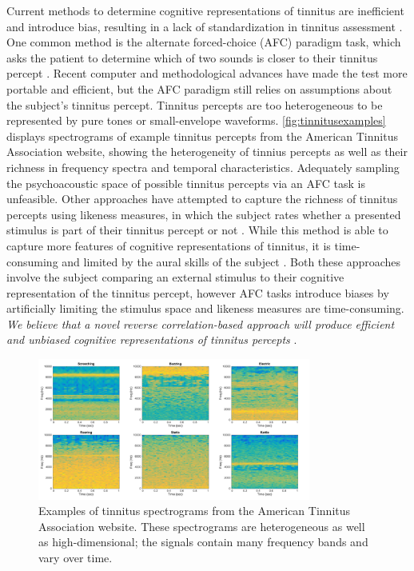 \documentclass[11pt, notitlepage]{article} %
\begin{document}
Current methods to determine cognitive representations of tinnitus
are inefficient and introduce bias, resulting in a lack of standardization in tinnitus assessment \cite{henryTinnitusEpidemiologicPerspective2020}.
One common method is the alternate forced-choice (AFC) paradigm task, which asks the patient to determine which of two sounds
is closer to their tinnitus percept
\cite{henryComparisonTwoComputerautomated2001,henryComputerautomatedTinnitusAssessment2004,henryComputerautomatedTinnitusAssessment2013,korthOneStepCloser2020}.
Recent computer and methodological advances have made the test more portable and efficient,
but the AFC paradigm still relies on assumptions about the subject's tinnitus percept.
Tinnitus percepts are too heterogeneous to be represented by pure tones or small-envelope waveforms.
\autoref{fig:tinnitusexamples} displays spectrograms of example tinnitus percepts
from the American Tinnitus Association website,
showing the heterogeneity of tinnius percepts as well as their richness in frequency spectra and temporal characteristics.
Adequately sampling the psychoacoustic space of possible tinnitus percepts via an AFC task is unfeasible.
Other approaches have attempted to capture the richness of tinnitus percepts using likeness measures,
in which the subject rates whether a presented stimulus is part of their tinnitus percept or not \cite{norenaPsychoacousticCharacterizationTinnitus2002}.
While this method is able to capture more features of cognitive representations of tinnitus,
it is time-consuming and limited by the aural skills of the subject \cite{vajsakovicPrinciplesMethodsPsychoacoustic2021}.
Both these approaches involve the subject comparing an external stimulus to their cognitive representation of the tinnitus percept,
however AFC tasks introduce biases by artificially limiting the stimulus space and likeness measures are time-consuming.
\emph{We believe that a novel reverse correlation-based approach will produce efficient and unbiased cognitive representations of tinnitus percepts}
\cite{gosselinSuperstitiousPerceptionsReveal2003}.

\begin{figure}[h] %
	\centering
	\includegraphics[width=0.8\textwidth]{Figures/Figures_tinnitus_6.png}
	\caption{Examples of tinnitus spectrograms from the American Tinnitus Association website.
	These spectrograms are heterogeneous as well as high-dimensional; the signals contain many frequency bands and vary over time.}
	\label{fig:tinnitusexamples}
\end{figure}
\end{document}
